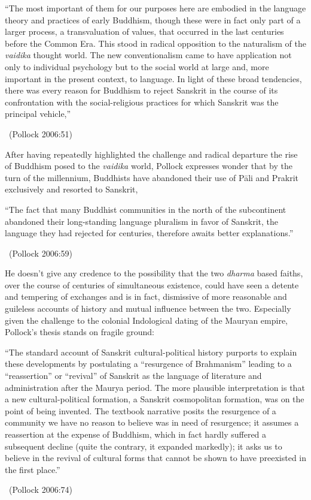 \begin{myquote}
“The most important of them for our purposes here are embodied in the language theory and practices of early Buddhism, though these were in fact only part of a larger process, a transvaluation of values, that occurred in the last centuries before the Common Era. This stood in radical opposition to the naturalism of the \textit{vaidika} thought world. The new conventionalism came to have application not only to individual psychology but to the social world at large and, more important in the present context, to language. In light of these broad tendencies, there was every reason for Buddhism to reject Sanskrit in the course of its confrontation with the social-religious practices for which Sanskrit was the principal vehicle,” 

~\hfill (Pollock 2006:51)
\end{myquote}

After having repeatedly highlighted the challenge and radical departure the rise of Buddhism posed to the \textit{vaidika} world, Pollock expresses wonder that by the turn of the millennium, Buddhists have abandoned their use of Pāli and Prakrit exclusively and resorted to Sanskrit,

\begin{myquote}
“The fact that many Buddhist communities in the north of the subcontinent abandoned their long-standing language pluralism in favor of Sanskrit, the language they had rejected for centuries, therefore awaits better explanations.” 

~\hfill (Pollock 2006:59)
\end{myquote}

He doesn’t give any credence to the possibility that the two \textit{dharma} based faiths, over the course of centuries of simultaneous existence, could have seen a detente and tempering of exchanges and is in fact, dismissive of more reasonable and guileless accounts of history and mutual influence between the two. Especially given the challenge to the colonial Indological dating of the Mauryan empire, Pollock’s thesis stands on fragile ground:

\begin{myquote}
“The standard account of Sanskrit cultural-political history purports to explain these developments by postulating a “resurgence of Brahmanism” leading to a “reassertion” or “revival” of Sanskrit as the language of literature and administration after the Maurya period. The more plausible interpretation is that a new cultural-political formation, a Sanskrit cosmopolitan formation, was on the point of being invented. The textbook narrative posits the resurgence of a community we have no reason to believe was in need of resurgence; it assumes a reassertion at the expense of Buddhism, which in fact hardly suffered a subsequent decline (quite the contrary, it expanded markedly); it asks us to believe in the revival of cultural forms that cannot be shown to have preexisted in the first place.” 

~\hfill (Pollock 2006:74)
\end{myquote}

